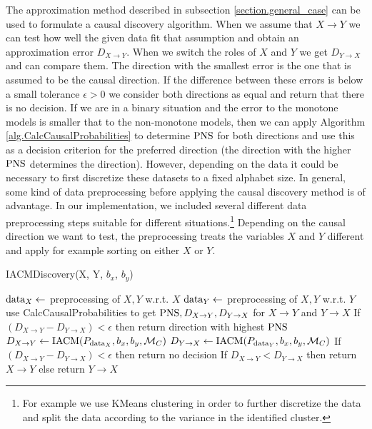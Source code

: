 \documentclass[letterpaper]{article}
\newcommand{\kM}{\mathcal{M}}   %
\newcommand{\PNS}{{\rm PNS}}
\begin{document}
The approximation method described in subsection \ref{section.general_case} can be used to formulate a causal discovery algorithm. When we assume that $X \rightarrow Y$ we can test how well the given data fit that assumption and obtain an approximation error $D_{X\rightarrow Y}$. When we switch the roles of $X$ and $Y$ we get $D_{Y \rightarrow X}$ and can compare them. The direction with the smallest error is the one that is assumed to be the causal direction. If the difference between these errors is below a small tolerance $\epsilon>0$ we consider both directions as equal and return that there is no decision. If we are in a binary situation and the error to the monotone models is smaller that to the non-monotone models, then we can apply Algorithm \ref{alg.CalcCausalProbabilities} to determine $\PNS$ for both directions and use this as a decision criterion for the preferred direction (the direction with the higher $\PNS$ determines the direction). However, depending on the data it could be necessary to first discretize these datasets to a fixed alphabet size. In general, some kind of data preprocessing before applying the causal discovery method is of advantage. In our implementation, we included several different data preprocessing steps suitable for different situations.\footnote{For example we use KMeans clustering in order to further discretize the data and split the data according to the variance in the identified cluster.} Depending on the causal direction we want to test, the preprocessing treats the variables $X$ and $Y$ different and apply for example sorting on either $X$ or $Y$.

\begin{algorithm}
\caption{IACMDiscovery(X, Y, $b_x$, $b_y$)}
\label{alg.iacmdiscovery}
\begin{algorithmic}[1]
\State ${\rm data}_X \gets$ preprocessing of $X, Y$ w.r.t. $X$
\State ${\rm data}_Y \gets$ preprocessing of $X, Y$ w.r.t. $Y$
	\State use CalcCausalProbabilities to get ${\rm PNS}, D_{X \rightarrow Y}, D_{Y \rightarrow X}$ for $X\rightarrow Y$ and $Y \rightarrow X$
	\State If $(D_{X \rightarrow Y} - D_{Y \rightarrow X})<\epsilon$ then return direction with highest ${\rm PNS}$
\Else
	\State $D_{X \rightarrow Y} \gets {\rm IACM}(P_{{\rm data}_X}, b_x, b_y, \kM_C)$
	\State $D_{Y \rightarrow X} \gets {\rm IACM}(P_{{\rm data}_Y}, b_x, b_y, \kM_C)$
	\State If $(D_{X \rightarrow Y} - D_{Y \rightarrow X})<\epsilon$ then return no decision
\EndIf
\State If $D_{X \rightarrow Y} < D_{Y \rightarrow X}$ then return $X\rightarrow Y$  else return $Y\rightarrow X$
\end{algorithmic}
\end{algorithm}
\end{document}
